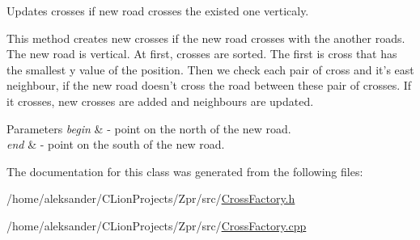Updates crosses if new road crosses the existed one verticaly. 

This method creates new crosses if the new road crosses with the another roads. The new road is vertical. At first, crosses are sorted. The first is cross that has the smallest y value of the position. Then we check each pair of cross and it's east neighbour, if the new road doesn't cross the road between these pair of crosses. If it crosses, new crosses are added and neighbours are updated. 
\begin{DoxyParams}{Parameters}
{\em begin} & -\/ point on the north of the new road. \\
\hline
{\em end} & -\/ point on the south of the new road. \\
\hline
\end{DoxyParams}


The documentation for this class was generated from the following files\-:\begin{DoxyCompactItemize}
\item 
/home/aleksander/\-C\-Lion\-Projects/\-Zpr/src/\hyperlink{CrossFactory_8h}{Cross\-Factory.\-h}\item 
/home/aleksander/\-C\-Lion\-Projects/\-Zpr/src/\hyperlink{CrossFactory_8cpp}{Cross\-Factory.\-cpp}\end{DoxyCompactItemize}
